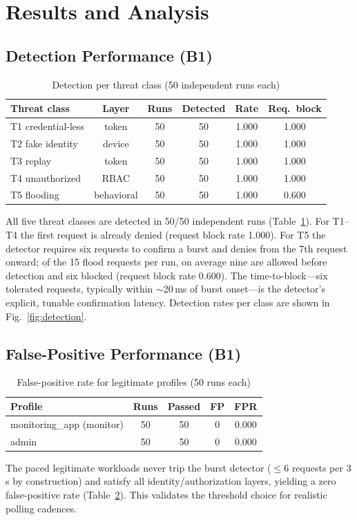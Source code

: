 \documentclass[journal]{IEEEtran}
\begin{document}
\section{Results and Analysis}
\subsection{Detection Performance (B1)}
\begin{table}[t]
\centering
\caption{Detection per threat class (50 independent runs each)}
\label{tab:b1}
\begin{tabular}{@{}lccccc@{}}
\toprule
Threat class & Layer & Runs & Detected & Rate & Req.\ block\\
\midrule
T1 credential-less & token & 50 & 50 & 1.000 & 1.000\\
T2 fake identity & device & 50 & 50 & 1.000 & 1.000\\
T3 replay & token & 50 & 50 & 1.000 & 1.000\\
T4 unauthorized & RBAC & 50 & 50 & 1.000 & 1.000\\
T5 flooding & behavioral & 50 & 50 & 1.000 & 0.600\\
\bottomrule
\end{tabular}
\end{table}
All five threat classes are detected in 50/50 independent runs (Table~\ref{tab:b1}). For T1--T4 the first request is already denied (request block rate 1.000). For T5 the detector requires six requests to confirm a burst and denies from the 7th request onward; of the 15 flood requests per run, on average nine are allowed before detection and six blocked (request block rate 0.600). The time-to-block---six tolerated requests, typically within $\sim$20\,ms of burst onset---is the detector's explicit, tunable confirmation latency. Detection rates per class are shown in Fig.~\ref{fig:detection}.

\subsection{False-Positive Performance (B1)}
\begin{table}[t]
\centering
\caption{False-positive rate for legitimate profiles (50 runs each)}
\label{tab:fpr}
\begin{tabular}{@{}lcccc@{}}
\toprule
Profile & Runs & Passed & FP & FPR\\
\midrule
monitoring\_app (monitor) & 50 & 50 & 0 & 0.000\\
admin & 50 & 50 & 0 & 0.000\\
\bottomrule
\end{tabular}
\end{table}
The paced legitimate workloads never trip the burst detector ($\leq 6$ requests per 3\,s by construction) and satisfy all identity/authorization layers, yielding a zero false-positive rate (Table~\ref{tab:fpr}). This validates the threshold choice for realistic polling cadences.
\end{document}
